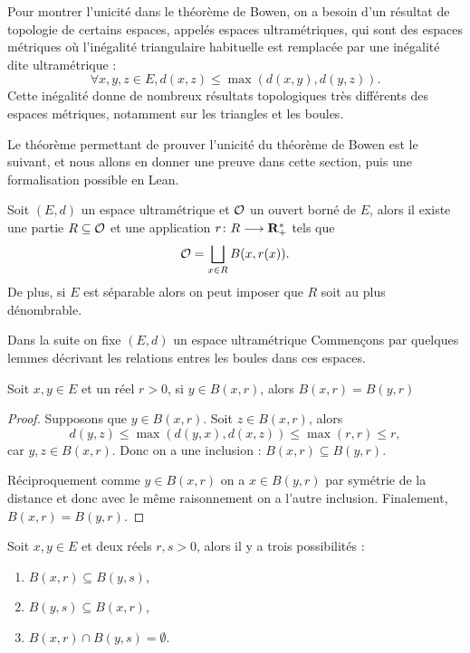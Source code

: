 \documentclass[../../rapport.tex]{subfiles}
\begin{document}
  Pour montrer l'unicité dans le théorème de Bowen, on a besoin d'un résultat de topologie de certains espaces,
  appelés espaces ultramétriques, qui sont des espaces métriques où l'inégalité triangulaire habituelle est remplacée
  par une inégalité dite ultramétrique :
  $$\forall x, y, z \in E, d(x, z) \le \max{(d(x, y), d(y, z))}.$$
  Cette inégalité donne de nombreux résultats topologiques très différents des espaces métriques,
  notamment sur les triangles et les boules.

  Le théorème permettant de prouver l'unicité du théorème de Bowen est le suivant,
  et nous allons en donner une preuve dans cette section,
  puis une formalisation possible en Lean.

  \begin{theorem}
    \label{thm:open_bdd_eq_disjoint_union_ball}
    Soit $(E, d)$ un espace ultramétrique et $\mathcal{O}$ un ouvert borné de $E$,
    alors il existe une partie $R \subseteq \mathcal{O}$ et une application $r \colon R \longrightarrow \mathbf R^*_+$ tels que
    $$\mathcal{O} = \bigsqcup_{x \in R}{B(x, r(x))}.$$
    De plus, si $E$ est séparable alors on peut imposer que $R$ soit au plus dénombrable.
  \end{theorem}

  Dans la suite on fixe $(E, d)$ un espace ultramétrique
  Commençons par quelques lemmes décrivant les relations entres les boules dans ces espaces.

  \begin{lemma}
    \label{lem:ball_eq_of_mem}
    Soit $x, y \in E$ et un réel $r > 0$, si $y \in B(x, r)$, alors $B(x, r) = B(y, r)$
  \end{lemma}

  \begin{proof}
    Supposons que $y \in B(x, r)$. Soit $z \in B(x, r)$, alors
    $$d(y, z) \le \max{(d(y, x), d(x, z))} \le \max{(r, r)} \le r,$$
    car $y, z \in B(x, r)$. Donc on a une inclusion : $B(x, r) \subseteq B(y, r)$.

    Réciproquement comme $y \in B(x, r)$ on a $x \in B(y, r)$ par symétrie de la distance
    et donc avec le même raisonnement on a l'autre inclusion.
    Finalement, $B(x, r) = B(y, r)$.
  \end{proof}

  \begin{lemma}
    \label{lem:ball_subset_trichotomy}
    Soit $x, y \in E$ et deux réels $r, s > 0$, alors il y a trois possibilités :
    \begin{enumerate}
      \item $B(x, r) \subseteq B(y, s)$,
      \item $B(y, s) \subseteq B(x, r)$,
      \item $B(x, r) \cap B(y, s) = \emptyset$.
    \end{enumerate}
  \end{lemma}
\end{document}
